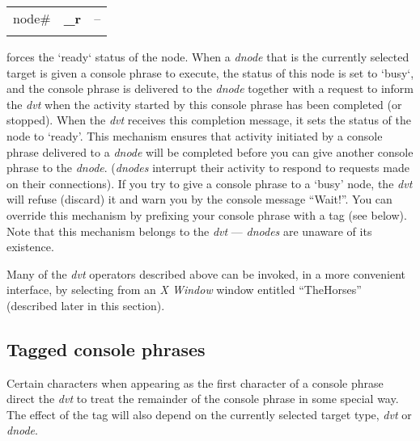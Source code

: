 \begin{tabular}{>{\sffamily}r>{\sffamily\bfseries}l>{\sffamily}l}
node\# & \_r & --\\\\
\end{tabular} 

\noindent forces the `ready` status of the node. When a \emph{dnode} that is the currently selected target is given a console phrase to execute, the status of this node is set to `busy`, and the console phrase is delivered to the \emph{dnode} together with a request to inform the \emph{dvt} when the activity started by this console phrase has been completed (or stopped). When the \emph{dvt} receives this completion message, it sets the status of the node to `ready'. This mechanism ensures that activity initiated by a console phrase delivered to a \emph{dnode} will be completed before you can give another console phrase to the \emph{dnode}. (\emph{dnodes} interrupt their activity to respond to requests made on their connections). If you try to give a console phrase to a `busy' node, the \emph{dvt} will refuse (discard) it and warn you by the console message ``Wait!''. You can override this mechanism by prefixing your console phrase with a tag (see below). Note that this mechanism belongs to the \emph{dvt} --- \emph{dnodes} are unaware of its existence.

Many of the \emph{dvt} operators described above can be invoked, in a more convenient interface, by selecting from an \emph{X Window} window entitled ``TheHorses'' (described later in this section).

\subsection{Tagged console phrases}

Certain characters when appearing as the first character of a console phrase direct the \emph{dvt} to treat the remainder of the console phrase in some special way. The effect of the tag will also depend on the currently selected target type, \emph{dvt} or \emph{dnode}.\\

